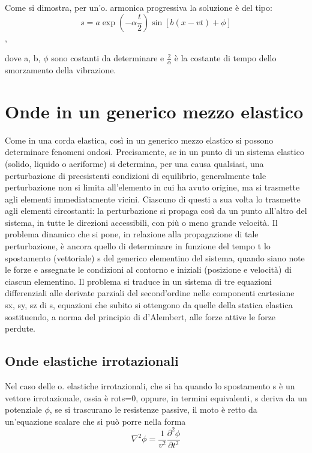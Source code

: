 \documentclass[a4paper]{article}
\begin{document}
Come si dimostra, per un'o. armonica progressiva la soluzione è del tipo:
\begin{equation}
s = a \exp(- \alpha \frac{t}{2})\sin[b (x - vt) +\phi]
\end{equation},

dove a, b, $\phi$ sono costanti da determinare e $\frac{2}{\alpha}$ è la costante di tempo dello smorzamento della vibrazione. 

\section{Onde in un generico mezzo elastico}
Come in una corda elastica, così in un generico mezzo elastico si possono determinare fenomeni ondosi. Precisamente, se in un punto di un sistema elastico (solido, liquido o aeriforme) si determina, per una causa qualsiasi, una perturbazione di preesistenti condizioni di equilibrio, generalmente tale perturbazione non si limita all'elemento in cui ha avuto origine, ma si trasmette agli elementi immediatamente vicini. Ciascuno di questi a sua volta lo trasmette agli elementi circostanti: la perturbazione si propaga così da un punto all'altro del sistema, in tutte le direzioni accessibili, con più o meno grande velocità. Il problema dinamico che si pone, in relazione alla propagazione di tale perturbazione, è ancora quello di determinare in funzione del tempo t lo spostamento (vettoriale) s del generico elementino del sistema, quando siano note le forze e assegnate le condizioni al contorno e iniziali (posizione e velocità) di ciascun elementino. Il problema si traduce in un sistema di tre equazioni differenziali alle derivate parziali del second'ordine nelle componenti cartesiane sx, sy, sz di s, equazioni che subito si ottengono da quelle della statica elastica sostituendo, a norma del principio di d'Alembert, alle forze attive le forze perdute.

\subsection{Onde elastiche irrotazionali}
Nel caso delle o. elastiche irrotazionali, che si ha quando lo spostamento s è un vettore irrotazionale, ossia è rots=0, oppure, in termini equivalenti, s deriva da un potenziale $\phi$, se si trascurano le resistenze passive, il moto è retto da un'equazione scalare che si può porre nella forma 
\begin{equation}
\nabla^2\phi=\frac{1}{v^2}\frac{\partial^2 \phi}{\partial t^2}
\end{equation}
\end{document}
